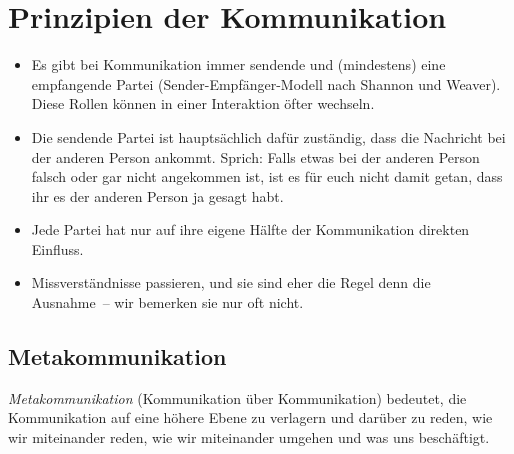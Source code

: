 \section{Prinzipien der Kommunikation}
\label{kommunikationsprinzipien}

\begin{itemize}
    \item Es gibt bei Kommunikation immer sendende und (mindestens) eine empfangende Partei (Sender-Empfänger-Modell nach Shannon und Weaver). Diese Rollen können in einer Interaktion öfter wechseln.
    \item Die sendende Partei ist hauptsächlich dafür zuständig, dass die Nachricht bei der anderen Person ankommt. Sprich: Falls etwas bei der anderen Person falsch oder gar nicht angekommen ist, ist es für euch nicht damit getan, dass ihr es der anderen Person \glqq ja gesagt habt\grqq.
    \item Jede Partei hat nur auf ihre eigene Hälfte der Kommunikation direkten Einfluss.
    \item Missverständnisse passieren, und sie sind eher die Regel denn die Ausnahme~-- wir bemerken sie nur oft nicht.
\end{itemize}

\subsection{Metakommunikation}
\label{metakommunikation}

\emph{Metakommunikation} (\glqq Kommunikation über Kommunikation\grqq) bedeutet, die Kommunikation auf eine höhere Ebene zu verlagern und darüber zu reden, wie wir miteinander reden, wie wir miteinander umgehen und was uns beschäftigt.
